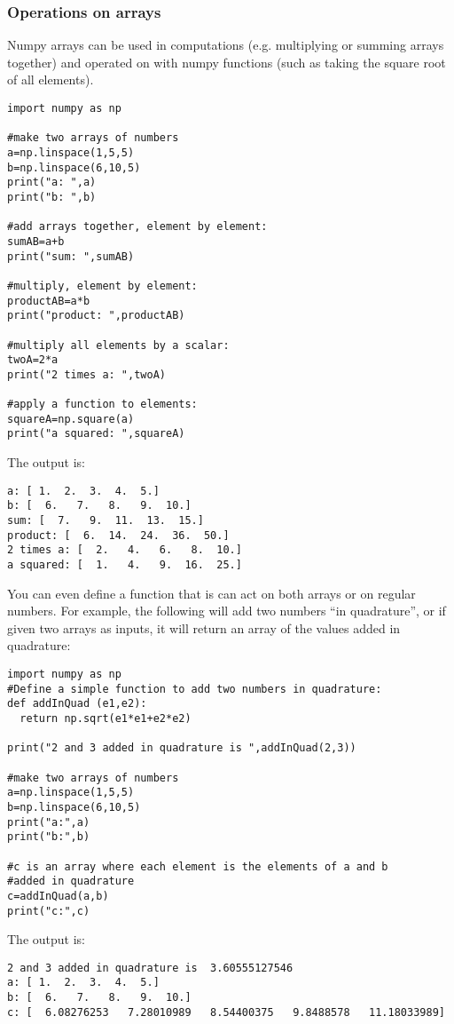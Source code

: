 \subsubsection{Operations on arrays}
Numpy arrays can be used in computations (e.g. multiplying or summing arrays together) and operated on with numpy functions (such as taking the square root of all elements).
 
\begin{lstlisting}[frame=single] 
import numpy as np

#make two arrays of numbers
a=np.linspace(1,5,5)
b=np.linspace(6,10,5)
print("a: ",a)
print("b: ",b)

#add arrays together, element by element:
sumAB=a+b
print("sum: ",sumAB)

#multiply, element by element:
productAB=a*b
print("product: ",productAB)

#multiply all elements by a scalar:
twoA=2*a
print("2 times a: ",twoA)

#apply a function to elements:
squareA=np.square(a)
print("a squared: ",squareA)
\end{lstlisting} 
The output is:
\begin{verbatim}
a: [ 1.  2.  3.  4.  5.]
b: [  6.   7.   8.   9.  10.]
sum: [  7.   9.  11.  13.  15.]
product: [  6.  14.  24.  36.  50.]
2 times a: [  2.   4.   6.   8.  10.]
a squared: [  1.   4.   9.  16.  25.]
\end{verbatim}

You can even define a function that is can act on both arrays or on regular numbers. For example, the following will add two numbers ``in quadrature'', or if given two arrays as inputs, it will return an array of the values added in quadrature:
\begin{lstlisting}[frame=single] 
import numpy as np
#Define a simple function to add two numbers in quadrature:
def addInQuad (e1,e2):
  return np.sqrt(e1*e1+e2*e2)

print("2 and 3 added in quadrature is ",addInQuad(2,3))

#make two arrays of numbers
a=np.linspace(1,5,5)
b=np.linspace(6,10,5)
print("a:",a)
print("b:",b)

#c is an array where each element is the elements of a and b 
#added in quadrature
c=addInQuad(a,b)
print("c:",c)
\end{lstlisting} 
The output is:
\begin{verbatim}
2 and 3 added in quadrature is  3.60555127546
a: [ 1.  2.  3.  4.  5.]
b: [  6.   7.   8.   9.  10.]
c: [  6.08276253   7.28010989   8.54400375   9.8488578   11.18033989]
\end{verbatim}
